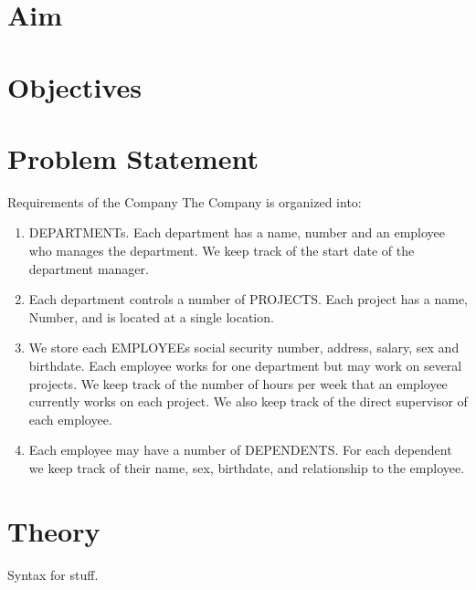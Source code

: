 \documentclass[11pt]{article}
\begin{document}
\tableofcontents
\thispagestyle{empty}
\clearpage

\setcounter{page}{1}

\section{Aim}

\section{Objectives}

\section{Problem Statement}
Requirements of the Company
The Company is organized into: 
\begin{enumerate}
    \item DEPARTMENTs. Each department has a name, number and an employee who manages the department. We keep track of the start date of the department manager. 
    \item Each department controls a number of PROJECTS. Each project has a name, Number, and is located at a single location. 
    \item We store each EMPLOYEEs social security number, address, salary, sex and birthdate. Each employee works for one department but may work on several projects. We keep track of the number of hours per week that an employee currently works on each project. We also keep track of the direct supervisor of each employee. 
    \item Each employee may have a number of DEPENDENTS. For each dependent we keep track of their name, sex, birthdate, and relationship to the employee.
\end{enumerate}

\section{Theory}

Syntax for stuff. 
\end{document}
